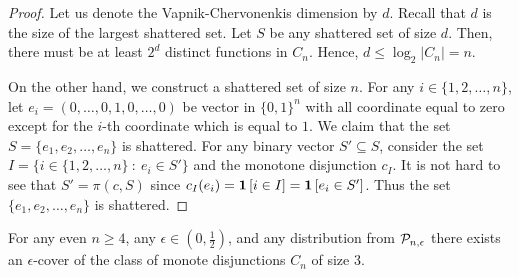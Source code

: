 \begin{proof}
Let us denote the Vapnik-Chervonenkis dimension by $d$. Recall that $d$ is the
size of the largest shattered set. Let $S$ be any shattered set of size $d$.
Then, there must be at least $2^d$ distinct functions in $C_n$. Hence, $d \le
\log_2 |C_n| = n$.

On the other hand, we construct a shattered set of size $n$. For any $i \in
\{1,2,\dots,n\}$, let $e_i = (0, \dots, 0, 1, 0, \dots, 0)$ be vector in
$\{0,1\}^n$ with all coordinate equal to zero except for the $i$-th coordinate
which is equal to $1$. We claim that the set $S = \{e_1, e_2, \dots, e_n\}$ is
shattered. For any binary vector $S' \subseteq S$, consider the set $I = \{ i
\in \{1,2,\dots,n\} ~:~ e_i \in S' \}$ and the monotone disjunction $c_I$. It is
not hard to see that $S' = \pi(c, S)$ since $c_I(e_i) = \indicator{i \in I} =
\indicator{e_i \in S'}$. Thus the set $\{e_1, e_2, \dots, e_n\}$ is shattered.
\end{proof}

\begin{lemma}
For any even $n \ge 4$, any $\epsilon \in (0,\frac{1}{2})$, and any distribution
from $\P_{n,\epsilon}$ there exists an $\epsilon$-cover of the class of monote
disjunctions $C_n$ of size $3$.
\end{lemma}

